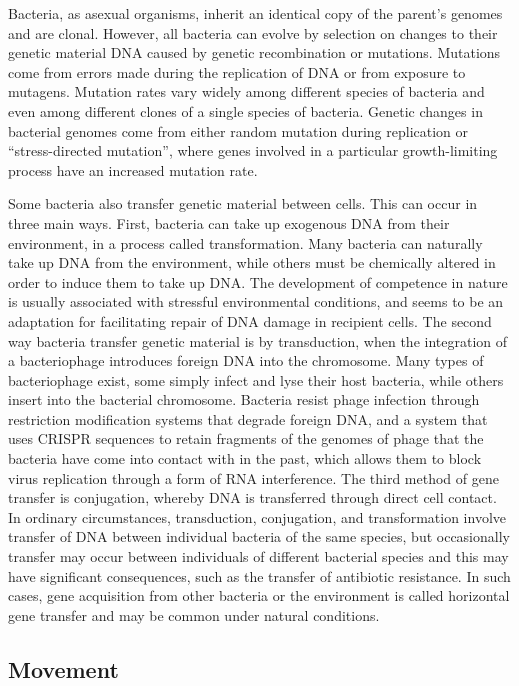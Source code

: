 Bacteria, as asexual organisms, inherit an identical copy of the parent's genomes and are clonal. However, all bacteria can evolve by selection on changes to their genetic material DNA caused by genetic recombination or mutations. Mutations come from errors made during the replication of DNA or from exposure to mutagens. Mutation rates vary widely among different species of bacteria and even among different clones of a single species of bacteria. Genetic changes in bacterial genomes come from either random mutation during replication or ``stress-directed mutation'', where genes involved in a particular growth-limiting process have an increased mutation rate.

Some bacteria also transfer genetic material between cells. This can occur in three main ways. First, bacteria can take up exogenous DNA from their environment, in a process called transformation. Many bacteria can naturally take up DNA from the environment, while others must be chemically altered in order to induce them to take up DNA. The development of competence in nature is usually associated with stressful environmental conditions, and seems to be an adaptation for facilitating repair of DNA damage in recipient cells. The second way bacteria transfer genetic material is by transduction, when the integration of a bacteriophage introduces foreign DNA into the chromosome. Many types of bacteriophage exist, some simply infect and lyse their host bacteria, while others insert into the bacterial chromosome. Bacteria resist phage infection through restriction modification systems that degrade foreign DNA, and a system that uses CRISPR sequences to retain fragments of the genomes of phage that the bacteria have come into contact with in the past, which allows them to block virus replication through a form of RNA interference. The third method of gene transfer is conjugation, whereby DNA is transferred through direct cell contact. In ordinary circumstances, transduction, conjugation, and transformation involve transfer of DNA between individual bacteria of the same species, but occasionally transfer may occur between individuals of different bacterial species and this may have significant consequences, such as the transfer of antibiotic resistance. In such cases, gene acquisition from other bacteria or the environment is called horizontal gene transfer and may be common under natural conditions.

\hypertarget{movement}{%
\subsection{Movement}\label{movement}}

